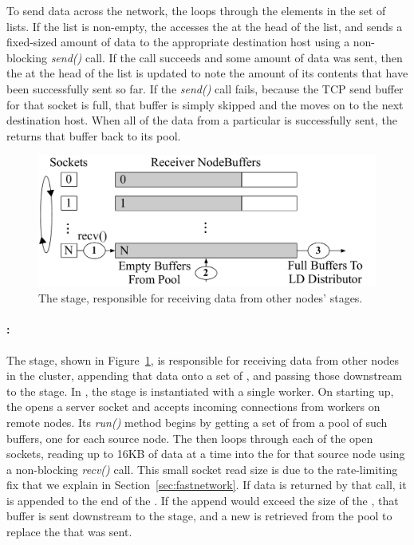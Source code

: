 To send data across the network, the \sender loops through the elements in the
set of \nodebuffer lists.  If the list is non-empty, the \sender accesses the
\nodebuffer at the head of the list, and sends a fixed-sized amount of data to
the appropriate destination host using a non-blocking \textit{send()} call.  If
the call succeeds and some amount of data was sent, then the \nodebuffer at the
head of the list is updated to note the amount of its contents that have been
successfully sent so far.  If the \textit{send()} call fails, because the TCP
send buffer for that socket is full, that buffer is simply skipped and the
\sender moves on to the next destination host.  When all of the data from a
particular \nodebuffer is successfully sent, the \sender returns that buffer
back to its pool.

\begin{figure}
  \centering \includegraphics[width=\columnwidth]{tritonsort/figs/receiver_stage.pdf}
  \caption{The \receiver stage, responsible for receiving data from other
    nodes' \sender stages.}
  \label{fig:receiver}
\end{figure}

\paragraph{\receiver:}  The \receiver stage, shown in
Figure~\ref{fig:receiver}, is responsible for receiving data from other nodes
in the cluster, appending that data onto a set of \nodebuffers, and passing
those \nodebuffers downstream to the \ldts stage.  In \tritonsort, the
\receiver stage is instantiated with a single worker.  On starting up, the
\receiver opens a server socket and accepts incoming connections from \sender
workers on remote nodes.  Its \textit{run()} method begins by getting a set of
\nodebuffers from a pool of such buffers, one for each source node.  The
\receiver then loops through each of the open sockets, reading up to 16KB of
data at a time into the \nodebuffer for that source node using a non-blocking
\textit{recv()} call.  This small socket read size is due to the rate-limiting
fix that we explain in Section~\ref{sec:fastnetwork}.  If data is returned by
that call, it is appended to the end of the \nodebuffer.  If the append would
exceed the size of the \nodebuffer, that buffer is sent downstream to the \ldts
stage, and a new \nodebuffer is retrieved from the pool to replace the
\nodebuffer that was sent.

